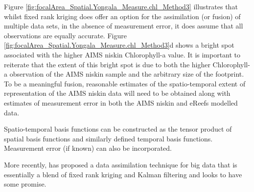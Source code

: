 Figure \ref{fig:focalArea_Spatial.Yongala_Measure.chl_Method3} illustrates that whilst fixed rank kriging does offer
an option for the assimilation (or fusion) of multiple data sets, in the absence of measurement error,
it does assume that all observations are equally accurate.  Figure \ref{fig:focalArea_Spatial.Yongala_Measure.chl_Method3}d
shows a bright spot associated with the higher AIMS niskin Chlorophyll-a value.
It is important to reiterate that the extent of this bright spot is due to both the higher Chlorophyll-a observation
of the AIMS niskin sample and the arbitrary size of the footprint.  To be a meaningful fusion, reasonable
estimates of the spatio-temporal extent of representation of the AIMS niskin data will need to be obtained along
with estimates of measurement error in both the AIMS niskin and eReefs modelled data.

Spatio-temporal basis functions can be constructed as the tensor product of spatial basis functions and
similarly defined temporal basis functions.  Measurement error (if known) can also be incorporated.

More recently, \citet{Nguyen-2014-175} has proposed a data assimilation technique for big data that is
essentially a blend of fixed rank kriging and Kalman filtering and looks to have some promise.